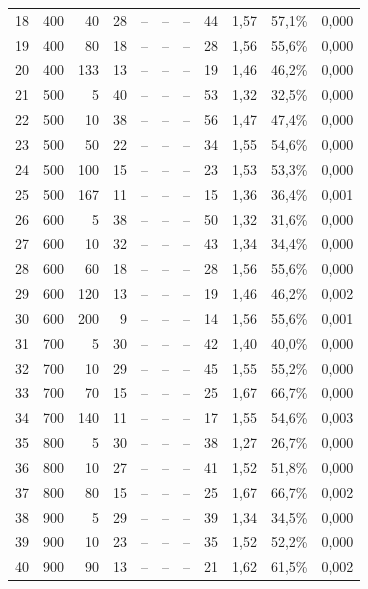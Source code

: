 \documentclass[10pt,twocolumn]{article}
\begin{document}
\begin{table}[t]
\begin{tabular}{rrrr|rrr|rrrr}
18 & 400 & 40  & 28  & --  & --   & --      & 44  & 1,57 & 57,1\% & 0,000 \\
19 & 400 & 80  & 18  & --  & --   & --      & 28  & 1,56 & 55,6\% & 0,000 \\
20 & 400 & 133 & 13  & --  & --   & --      & 19  & 1,46 & 46,2\% & 0,000 \\
21 & 500 & 5   & 40  & --  & --   & --      & 53  & 1,32 & 32,5\% & 0,000 \\
22 & 500 & 10  & 38  & --  & --   & --      & 56  & 1,47 & 47,4\% & 0,000 \\
23 & 500 & 50  & 22  & --  & --   & --      & 34  & 1,55 & 54,6\% & 0,000 \\
24 & 500 & 100 & 15  & --  & --   & --      & 23  & 1,53 & 53,3\% & 0,000 \\
25 & 500 & 167 & 11  & --  & --   & --      & 15  & 1,36 & 36,4\% & 0,001 \\
26 & 600 & 5   & 38  & --  & --   & --      & 50  & 1,32 & 31,6\% & 0,000 \\
27 & 600 & 10  & 32  & --  & --   & --      & 43  & 1,34 & 34,4\% & 0,000 \\
28 & 600 & 60  & 18  & --  & --   & --      & 28  & 1,56 & 55,6\% & 0,000 \\
29 & 600 & 120 & 13  & --  & --   & --      & 19  & 1,46 & 46,2\% & 0,002 \\
30 & 600 & 200 & 9   & --  & --   & --      & 14  & 1,56 & 55,6\% & 0,001 \\
31 & 700 & 5   & 30  & --  & --   & --      & 42  & 1,40 & 40,0\% & 0,000 \\
32 & 700 & 10  & 29  & --  & --   & --      & 45  & 1,55 & 55,2\% & 0,000 \\
33 & 700 & 70  & 15  & --  & --   & --      & 25  & 1,67 & 66,7\% & 0,000 \\
34 & 700 & 140 & 11  & --  & --   & --      & 17  & 1,55 & 54,6\% & 0,003 \\
35 & 800 & 5   & 30  & --  & --   & --      & 38  & 1,27 & 26,7\% & 0,000 \\
36 & 800 & 10  & 27  & --  & --   & --      & 41  & 1,52 & 51,8\% & 0,000 \\
37 & 800 & 80  & 15  & --  & --   & --      & 25  & 1,67 & 66,7\% & 0,002 \\
38 & 900 & 5   & 29  & --  & --   & --      & 39  & 1,34 & 34,5\% & 0,000 \\
39 & 900 & 10  & 23  & --  & --   & --      & 35  & 1,52 & 52,2\% & 0,000 \\
40 & 900 & 90  & 13  & --  & --   & --      & 21  & 1,62 & 61,5\% & 0,002 \\
\bottomrule
\end{tabular}
\end{table}
\end{document}
